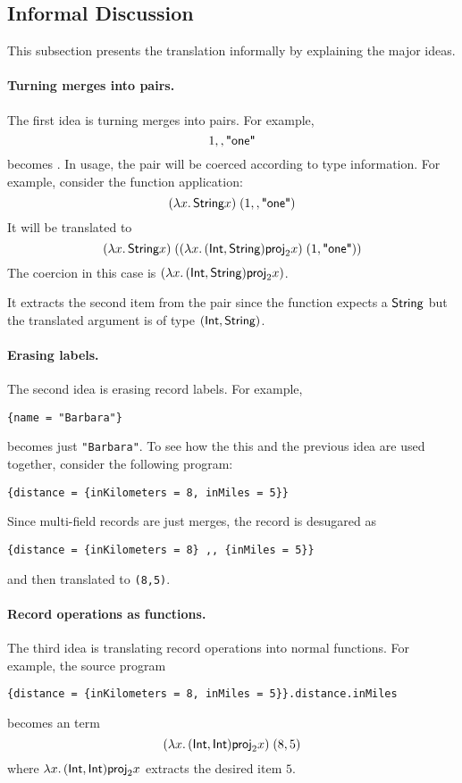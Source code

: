 \subsection{Informal Discussion}

This subsection presents the translation informally by explaining the major
ideas.

\paragraph{Turning merges into pairs.}
The first idea is turning merges into pairs. For example,
\[
1 ,, \textsf{"one"}
\]
becomes  {}.
In usage, the pair will be coerced according to type information. For example,
consider the function application:
\[
(\lambda x.\, \textsf{String} x) \; (1 ,, \textsf{"one"})
\]
It will be translated to
\[
(\lambda x.\, \textsf{String} x) \; ((\lambda x.\, (\textsf{Int}, \textsf{String}) {{\textsf{proj}}_{2} x}) \; (1, \textsf{"one"}))
\]
The coercion in this case is $(\lambda x.\, (\textsf{Int}, \textsf{String}) {{\textsf{proj}}_{2} x})$.

\noindent It extracts the second item from the pair since the function expects a $\textsf{String}$
but the translated argument is of type $(\textsf{Int}, \textsf{String})$.

\paragraph{Erasing labels.}
The second idea is erasing record labels. For example,
\begin{lstlisting}
{name = "Barbara"}
\end{lstlisting}
becomes just \lstinline{"Barbara"}.
To see how the this and the previous idea are used together, consider the following program:
\begin{lstlisting}
{distance = {inKilometers = 8, inMiles = 5}}
\end{lstlisting}
Since multi-field records are just merges, the record is desugared as
\begin{lstlisting}
{distance = {inKilometers = 8} ,, {inMiles = 5}}
\end{lstlisting}
and then translated to \lstinline{(8,5)}.

\paragraph{Record operations as functions.}
The third idea is translating record operations into normal functions. For
example, the source program
\begin{lstlisting}
{distance = {inKilometers = 8, inMiles = 5}}.distance.inMiles
\end{lstlisting}
becomes an \name term
\[
(\lambda x.\, (\textsf{Int}, \textsf{Int}) {{\textsf{proj}}_{2} x}) \; (8, 5)
\]
where $\lambda x.\, (\textsf{Int}, \textsf{Int}) {{\textsf{proj}}_{2} x}$
extracts the desired item $5$.

